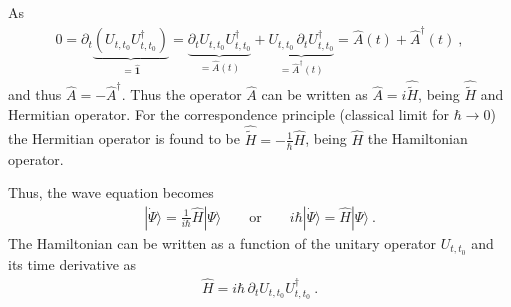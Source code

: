 \documentclass[letterpaper,10pt,english]{jupyterBook}
\begin{document}
\sphinxAtStartPar
{} As
\begin{equation*}
\begin{split}0 = \partial_t \underbrace{\left( U_{t,t_0} U_{t,t_0}^{\dagger} \right)}_{= \hat{\mathbf{1}} } = \underbrace{ \partial_t U_{t,t_0} U_{t,t_0}^\dagger}_{ = \hat{A}(t)} + \underbrace{ U_{t,t_0} \, \partial_t U_{t,t_0}^\dagger}_{= \hat{A}^\dagger(t)} = \hat{A}(t) + \hat{A}^\dagger(t) \ ,\end{split}
\end{equation*}
\sphinxAtStartPar
and thus \(\hat{A} = - \hat{A}^\dagger\). Thus the operator \(\hat{A}\) can be written as \(\hat{A} = i \hat{\tilde{H}}\), being \(\hat{\tilde{H}}\) and Hermitian operator. For the correspondence principle (classical limit for \(\hbar \rightarrow 0\)) the Hermitian operator is found to be \(\hat{\tilde{H}} = -\frac{1}{\hbar} \hat{H}\), being \(\hat{H}\) the Hamiltonian operator.  

\sphinxAtStartPar
Thus, the wave equation becomes
\begin{equation}\label{equation:ch/quantum-mechanics/wave-mechanics:eq:schrodinger}
\begin{split}| \dot{\Psi} \rangle = \frac{1}{i \hbar} \hat{H} | \Psi \rangle \qquad \text{or} \qquad i \hbar | \dot{\Psi} \rangle = \hat{H} | \Psi \rangle \ .\end{split}
\end{equation}
\sphinxAtStartPar
The Hamiltonian can be written as a function of the unitary operator \(U_{t,t_0}\) and its time derivative as
\begin{equation}\label{equation:ch/quantum-mechanics/wave-mechanics:eq:h-u-dtu}
\begin{split}\hat{H} = i \hbar \, \partial_t U_{t,t_0} U^{\dagger}_{t,t_0} \ .\end{split}
\end{equation}
\end{document}
